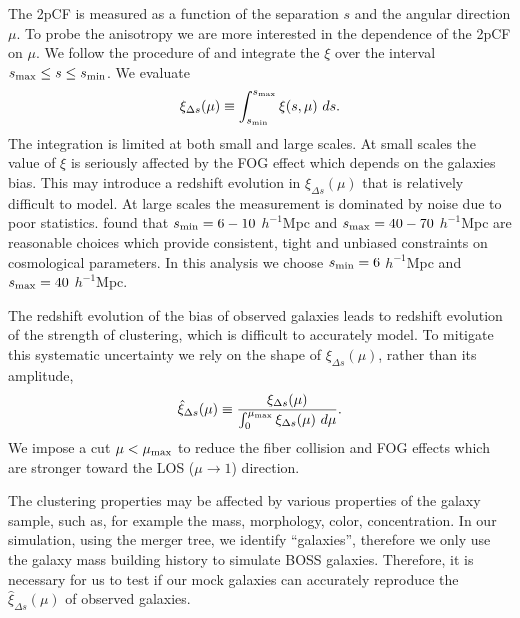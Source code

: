 \documentclass[iop]{emulateapj}
\begin{document}
The 2pCF is measured as a function of the separation $s$ and the angular direction $\mu$.
To probe the anisotropy we are more interested in the dependence of the 2pCF on $\mu$.
We follow the procedure of \cite{Li2015} and integrate the $\xi$ over the interval $s_{\rm max} \leq s \leq s_{\rm min}$.
We evaluate
\begin{equation}\label{eq:xideltas}
\xi_{\Delta s} (\mu) \equiv \int_{s_{\rm min}}^{s_{\rm max}} \xi (s,\mu)\ ds.%
\end{equation}
The integration is limited at both small and large scales.
At small scales the value of $\xi$ is seriously affected by the FOG effect \citep{FOG}
which depends on the galaxies bias.
This may introduce a redshift evolution in $\xi_{\Delta s}(\mu)$ that is relatively difficult to model.
At large scales the measurement is dominated by noise due to poor statistics.
\cite{Li2015} found that $s_{\rm min}=6-10$ $h^{-1}$Mpc and $s_{\rm max}=40-70$ $h^{-1}$Mpc are reasonable choices 
which provide consistent, tight and unbiased constraints on cosmological parameters.
In this analysis we choose $s_{\rm min}=6$ $h^{-1}$Mpc and $s_{\rm max}=40$ $h^{-1}$Mpc.

The redshift evolution of the bias of observed galaxies leads to redshift evolution of the strength of clustering,
which is difficult to accurately model.
To mitigate this systematic uncertainty we rely on the shape of $\xi_{\Delta s}(\mu)$, rather than its amplitude,
\begin{equation}\label{eq:norm}
 \hat\xi_{\Delta s}(\mu) \equiv \frac{\xi_{\Delta s}(\mu)}{\int_{0}^{\mu_{\rm max}}\xi_{\Delta s}(\mu)\ d\mu}.
\end{equation}
We impose a cut $\mu<\mu_{\rm max}$ to reduce the fiber collision and FOG effects which are stronger toward the LOS ($\mu\rightarrow1$) direction.



The clustering properties may be affected by various properties of the galaxy sample, 
such as, for example the mass, morphology, color, concentration. 
In our simulation, using the merger tree, 
we identify ``galaxies'', therefore we only use the galaxy mass building history to simulate BOSS galaxies. 
Therefore, it is necessary for us to test if our mock galaxies can accurately 
reproduce the $\hat\xi_{\Delta s}(\mu)$ of observed galaxies.

\end{document}
